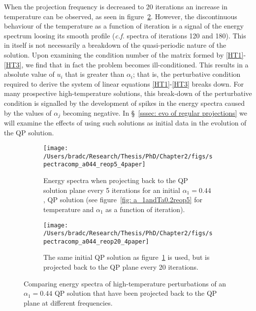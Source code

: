 \documentclass[../PhD.tex]{subfiles}
\begin{document}
When the projection frequency is decreased to 20 iterations an increase in temperature can be observed, as seen in figure~\ref{fig: spec comparisons reop20}. However, the discontinuous behaviour of the temperature as a function of iteration is a signal of the energy spectrum loosing its smooth profile ({\it c.f.} spectra of iterations 120 and 180). This in itself is not necessarily a breakdown of the quasi-periodic nature of the solution. Upon examining the condition number of the matrix formed by \eqref{HT1}-\eqref{HT3}, we find that in fact the problem becomes ill-conditioned. This results in a absolute value of $u_i$ that is greater than $\alpha_i$; that is, the perturbative condition required to derive the system of linear equations \eqref{HT1}-\eqref{HT3} breaks down. For many prospective high-temperature solutions, this break-down of the perturbative condition is signalled by the development of spikes in the energy spectra caused by the values of $\alpha_j$ becoming negative. In \S~\ref{sssec: evo of regular projections} we will examine the effects of using such solutions as initial data in the evolution of the QP solution.

\begin{figure}[h]
	\centering
	\begin{subfigure}[t]{0.45\textwidth}
		\texttt{[image: /Users/bradc/Research/Thesis/PhD/Chapter2/figs/spectracomp\_a044\_reop5\_4paper]}
		\caption{Energy spectra when projecting back to the QP solution plane every 5 iterations for an initial $\alpha_1 = 0.44$, QP solution (see figure~\ref{fig: a_1andTa0.2reop5} for temperature and $\alpha_1$ as a function of iteration).}
		\label{fig: spec comparisons reop5}
	\end{subfigure}
	\:
	\begin{subfigure}[t]{0.45\textwidth}
		\texttt{[image: /Users/bradc/Research/Thesis/PhD/Chapter2/figs/spectracomp\_a044\_reop20\_4paper]}
		\caption{The same initial QP solution as figure~\ref{fig: spec comparisons reop5} is used, but is projected back to the QP plane every 20 iterations.}
		\label{fig: spec comparisons reop20}
	\end{subfigure}
	\caption{Comparing energy spectra of high-temperature perturbations of an $\alpha_1=0.44$ QP solution that have been projected back to the QP plane at different frequencies.}
	\label{fig: spec comps with reop}
\end{figure}


\end{document}
